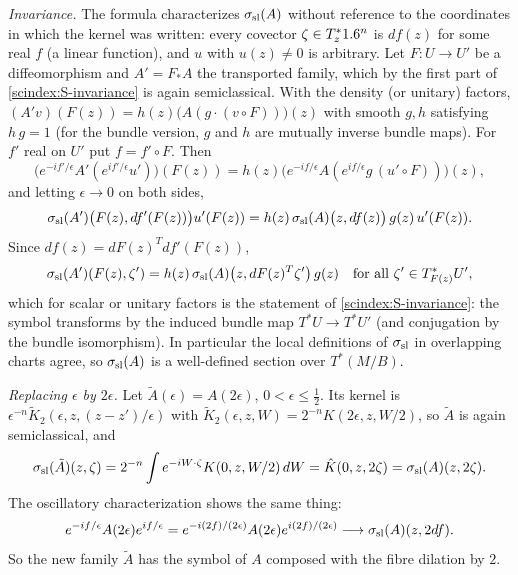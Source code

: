 \emph{Invariance.} The formula characterizes $\sigma_{\mathrm{sl}}(A)$ without reference to the
coordinates in which the kernel was written: every covector $\zeta\in T^*_z1.6^n$ is
$df(z)$ for some real $f$ (a linear function), and $u$ with $u(z)\ne0$ is arbitrary.
Let $F:U\to U'$ be a diffeomorphism and $A'=F_*A$ the transported family, which by
the first part of \ref{scindex:S-invariance} is again semiclassical. With the
density (or unitary) factors, $(A'v)(F(z))=h(z)\bigl(A(g\cdot(v\circ F))\bigr)(z)$
with smooth $g,h$ satisfying $h\,g=1$ (for the bundle version, $g$ and $h$ are
mutually inverse bundle maps). For $f'$ real on $U'$ put $f=f'\circ F$. Then
\begin{equation*}
  \bigl(e^{-if'/\epsilon}A'(e^{if'/\epsilon}u')\bigr)(F(z))
  =h(z)\bigl(e^{-if/\epsilon}A(e^{if/\epsilon}g\,(u'\circ F))\bigr)(z),
\end{equation*}
and letting $\epsilon\to0$ on both sides,
\begin{equation*}
  \sigma_{\mathrm{sl}}(A')\bigl(F(z),df'(F(z))\bigr)u'(F(z))=h(z)\,\sigma_{\mathrm{sl}}(A)\bigl(z,df(z)\bigr)\,g(z)\,u'(F(z)).
\end{equation*}
Since
$df(z)=dF(z)^Tdf'(F(z))$,
\begin{equation*}
  \sigma_{\mathrm{sl}}(A')(F(z),\zeta')=h(z)\,\sigma_{\mathrm{sl}}(A)\bigl(z,dF(z)^T\zeta'\bigr)\,g(z)
  \quad\text{for all }\zeta'\in T^*_{F(z)}U',
\end{equation*}
which for scalar or unitary factors is the statement of \ref{scindex:S-invariance}:
the symbol transforms by the induced bundle map $T^*U\to T^*U'$ (and conjugation
by the bundle isomorphism). In particular the local definitions of $\sigma_{\mathrm{sl}}$ in
overlapping charts agree, so $\sigma_{\mathrm{sl}}(A)$ is a well-defined section over
$T^*(M/B)$.

\emph{Replacing $\epsilon$ by $2\epsilon$.} Let $\tilde A(\epsilon)=A(2\epsilon)$,
$0<\epsilon\le\frac12$. Its kernel is $\epsilon^{-n}\tilde K_2(\epsilon,z,(z-z')/
\epsilon)$ with $\tilde K_2(\epsilon,z,W)=2^{-n}K(2\epsilon,z,W/2)$, so $\tilde A$ is
again semiclassical, and
\begin{equation*}
  \sigma_{\mathrm{sl}}(\tilde A)(z,\zeta)=2^{-n}\int e^{-iW\cdot\zeta}K(0,z,W/2)\,dW=\hat K(0,z,2\zeta)
  =\sigma_{\mathrm{sl}}(A)(z,2\zeta).
\end{equation*}
The oscillatory characterization shows the same thing:
\begin{equation*}
  e^{-if/\epsilon}A(2\epsilon)e^{if/\epsilon}=e^{-i(2f)/(2\epsilon)}A(2\epsilon)
  e^{i(2f)/(2\epsilon)}\longrightarrow\sigma_{\mathrm{sl}}(A)(z,2df).
\end{equation*}
So the new family $\tilde A$ has the symbol of $A$ composed with the fibre
dilation by $2$.

